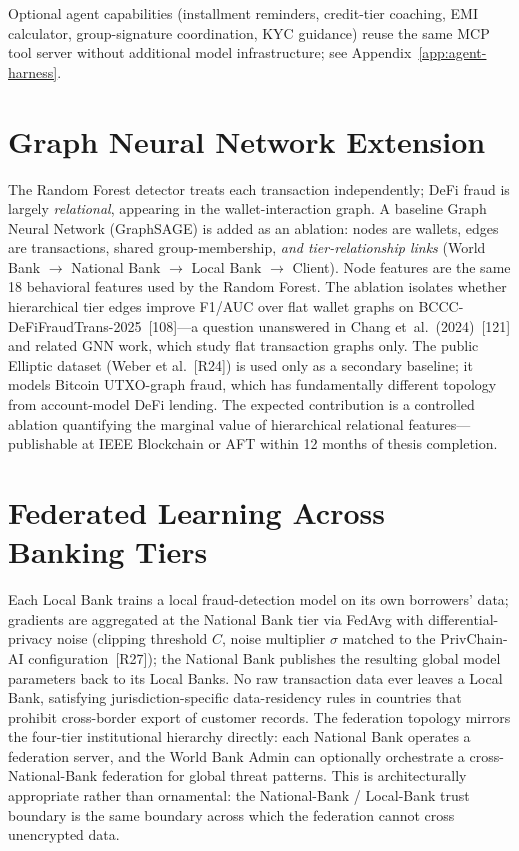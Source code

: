 \documentclass[12pt,a4paper]{report}
\begin{document}
\noindent Optional agent capabilities (installment reminders, credit-tier coaching, EMI calculator, group-signature coordination, KYC guidance) reuse the same MCP tool server without additional model infrastructure; see Appendix~\ref{app:agent-harness}.

\section{Graph Neural Network Extension}
\label{sec:gnn-extension}

The Random Forest detector treats each transaction independently; DeFi fraud is largely \emph{relational}, appearing in the wallet-interaction graph. A baseline Graph Neural Network (GraphSAGE) is added as an ablation: nodes are wallets, edges are transactions, shared group-membership, \textit{and tier-relationship links} (World Bank $\to$ National Bank $\to$ Local Bank $\to$ Client). Node features are the same 18 behavioral features used by the Random Forest. The ablation isolates whether hierarchical tier edges improve F1/AUC over flat wallet graphs on BCCC-DeFiFraudTrans-2025~[108]---a question unanswered in Chang et~al.~(2024)~[121] and related GNN work, which study flat transaction graphs only. The public Elliptic dataset (Weber et al.~[R24]) is used only as a secondary baseline; it models Bitcoin UTXO-graph fraud, which has fundamentally different topology from account-model DeFi lending. The expected contribution is a controlled ablation quantifying the marginal value of hierarchical relational features---publishable at IEEE Blockchain or AFT within 12 months of thesis completion.

\section{Federated Learning Across Banking Tiers}
\label{sec:fl-fraud}

Each Local Bank trains a local fraud-detection model on its own borrowers' data; gradients are aggregated at the National Bank tier via FedAvg with differential-privacy noise (clipping threshold $C$, noise multiplier $\sigma$ matched to the PrivChain-AI configuration~[R27]); the National Bank publishes the resulting global model parameters back to its Local Banks. No raw transaction data ever leaves a Local Bank, satisfying jurisdiction-specific data-residency rules in countries that prohibit cross-border export of customer records. The federation topology mirrors the four-tier institutional hierarchy directly: each National Bank operates a federation server, and the World Bank Admin can optionally orchestrate a cross-National-Bank federation for global threat patterns. This is architecturally appropriate rather than ornamental: the National-Bank / Local-Bank trust boundary is the same boundary across which the federation cannot cross unencrypted data.
\end{document}
